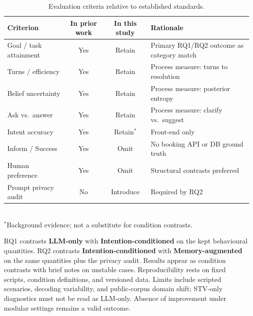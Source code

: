 \begin{table}[!ht]
  \centering
  \small
  \caption{Evaluation criteria relative to established standards.}
  \label{tab:method-metrics}
  \setlength{\tabcolsep}{3pt}
  \begin{tabular}{@{}p{}ccp{}@{}}
    \hline
    \textbf{Criterion} & \textbf{In prior work} & \textbf{In this study} & \textbf{Rationale} \\
    \hline
    Goal / task attainment & Yes & Retain & Primary RQ1/RQ2 outcome as category match~\cite{budzianowski_multiwoz_2018} \\
    Turns / efficiency & Yes & Retain & Process measure: turns to resolution~\cite{budzianowski_multiwoz_2018} \\
    Belief uncertainty & Yes & Retain & Process measure: posterior entropy~\cite{young_pomdp_2013} \\
    Ask vs.\ answer & Yes & Retain & Process measure: clarify vs.\ suggest~\cite{aliannejadi_clarifying_2019} \\
    Intent accuracy & Yes & Retain$^*$ & Front-end only~\cite{hemphill-etal-1990-atis,coucke_snips_2018} \\
    Inform / Success & Yes & Omit & No booking API or DB ground truth \\
    Human preference & Yes & Omit & Structural contrasts preferred \\
    Prompt privacy audit & No & Introduce & Required by RQ2~\cite{staufer_name_audit_2026} \\
    \hline
  \end{tabular}\\[0.3em]
  {\footnotesize $^*$Background evidence; not a substitute for condition contrasts.}
\end{table}

RQ1 contrasts \textbf{LLM-only} with \textbf{Intention-conditioned} on the kept behavioural quantities.
RQ2 contrasts \textbf{Intention-conditioned} with \textbf{Memory-augmented} on the same quantities plus the privacy audit.
Results appear as condition contrasts with brief notes on unstable cases.
Reproducibility rests on fixed scripts, condition definitions, and versioned data.
Limits include scripted scenarios, decoding variability, and public-corpus domain shift; STV-only diagnostics must not be read as LLM-only.
Absence of improvement under modular settings remains a valid outcome.

\cleardoublepage
